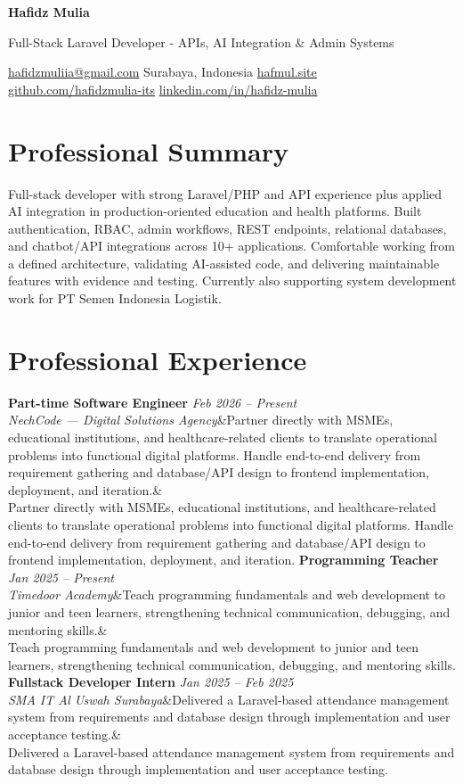 \documentclass[a4paper,10.5pt]{article}
\newcommand{\cvname}[1]{{\centering\LARGE\bfseries #1\par\vspace{1pt}}}
\newcommand{\cvtitle}[1]{{\centering\normalsize\color{accent} #1\par\vspace{2pt}}}
\newcommand{\cvcontact}[1]{{\centering\small #1\par\vspace{4pt}}}
\newcommand{\cventry}[4]{\noindent\textbf{#1} \hfill \textit{#3} \\\textit{#2}\ifx&#4& \else \\ {\small #4} \fi\vspace{4pt}}
\begin{document}
\cvname{Hafidz Mulia}
\cvtitle{Full-Stack Laravel Developer - APIs, AI Integration \& Admin Systems}
\cvcontact{\href{mailto:hafidzmuliia@gmail.com}{hafidzmuliia@gmail.com} \quad\textbar\quad Surabaya, Indonesia \quad\textbar\quad \href{https://hafmul.site}{hafmul.site} \\
\href{https://github.com/hafidzmulia-its}{github.com/hafidzmulia-its} \quad\textbar\quad \href{https://www.linkedin.com/in/hafidz-mulia/}{linkedin.com/in/hafidz-mulia}}

\section{Professional Summary}
Full-stack developer with strong Laravel/PHP and API experience plus applied AI integration in production-oriented education and health platforms. Built authentication, RBAC, admin workflows, REST endpoints, relational databases, and chatbot/API integrations across 10+ applications. Comfortable working from a defined architecture, validating AI-assisted code, and delivering maintainable features with evidence and testing. Currently also supporting system development work for PT Semen Indonesia Logistik.

\section{Professional Experience}
\cventry{Part-time Software Engineer}{NechCode --- Digital Solutions Agency}{Feb 2026 -- Present}{Partner directly with MSMEs, educational institutions, and healthcare-related clients to translate operational problems into functional digital platforms. Handle end-to-end delivery from requirement gathering and database/API design to frontend implementation, deployment, and iteration.}
\cventry{Programming Teacher}{Timedoor Academy}{Jan 2025 -- Present}{Teach programming fundamentals and web development to junior and teen learners, strengthening technical communication, debugging, and mentoring skills.}
\cventry{Fullstack Developer Intern}{SMA IT Al Uswah Surabaya}{Jan 2025 -- Feb 2025}{Delivered a Laravel-based attendance management system from requirements and database design through implementation and user acceptance testing.}
\end{document}
